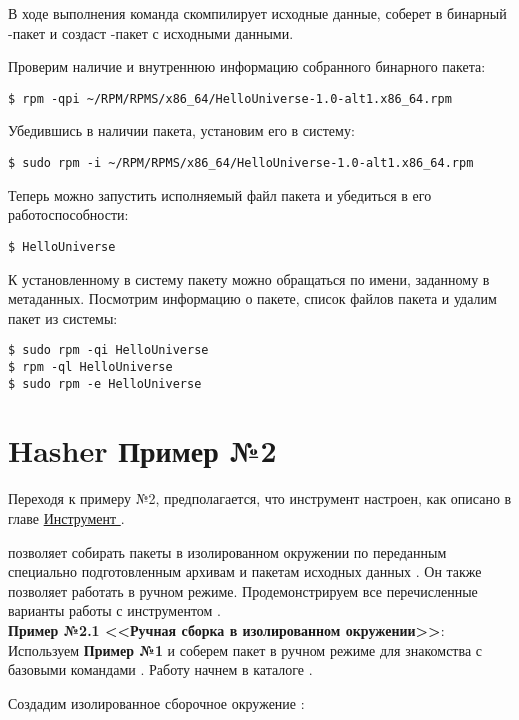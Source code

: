 В ходе выполнения команда скомпилирует исходные данные, соберет
в бинарный -пакет и создаст -пакет с исходными данными.

Проверим наличие и внутреннюю информацию собранного бинарного пакета:
\begin{verbatim}
$ rpm -qpi ~/RPM/RPMS/x86_64/HelloUniverse-1.0-alt1.x86_64.rpm
\end{verbatim}

Убедившись в наличии пакета, установим его в систему:
\begin{verbatim}
$ sudo rpm -i ~/RPM/RPMS/x86_64/HelloUniverse-1.0-alt1.x86_64.rpm
\end{verbatim}

Теперь можно запустить исполняемый файл пакета и убедиться в его
работоспособности:
\begin{verbatim}
$ HelloUniverse
\end{verbatim}

К установленному в систему пакету можно обращаться по имени, заданному в
метаданных. Посмотрим информацию о пакете, список файлов пакета и удалим
пакет из системы:
\begin{verbatim}
$ sudo rpm -qi HelloUniverse
$ rpm -ql HelloUniverse
$ sudo rpm -e HelloUniverse
\end{verbatim}

\section{Hasher \textbf{Пример №2}}

Переходя к примеру №2, предполагается, что инструмент  настроен,
как описано в главе \hyperlink{5}{Инструмент }.

 позволяет собирать пакеты в изолированном окружении по
переданным специально подготовленным архивам  и пакетам
исходных данных . Он также позволяет работать в ручном
режиме. Продемонстрируем все перечисленные варианты работы с
инструментом .\\

\textbf{Пример №2.1 <<Ручная сборка в изолированном окружении>>}:\\

Используем \textbf{Пример №1} и соберем пакет  в ручном режиме
для знакомства с базовыми командами . Работу начнем в
каталоге .

Создадим изолированное сборочное окружение :

